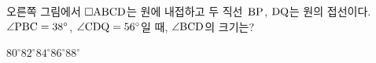 \noindent\begin{minipage}[t]{0.58\linewidth}\vspace{0pt}\raggedright 오른쪽 그림에서 $\square\mathrm{ABCD}$는 원에 내접하고 두 직선~$\mathrm{BP}$, $\mathrm{DQ}$는 원의 접선이다. $\angle\mathrm{PBC}=38^\circ$, $\angle\mathrm{CDQ}=56^\circ$일 때, $\angle\mathrm{BCD}$의 크기는?\end{minipage}\hfill\begin{minipage}[t]{0.4\linewidth}\vspace{0pt}\centering \resizebox{\ifdim\width>\linewidth\linewidth\else\width\fi}{!}{}\end{minipage}\par
\begin{choices32}{$80^\circ$}{$82^\circ$}{$84^\circ$}{$86^\circ$}{$88^\circ$}\end{choices32}
